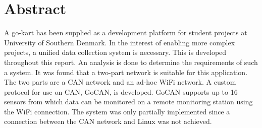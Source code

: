 \section*{Abstract}
A go-kart has been supplied as a development platform for student projects at University of Southern Denmark.
In the interest of enabling more complex projects, a unified data collection system is necessary.
This is developed throughout this report. 
An analysis is done to determine the requirements of such a system.
It was found that a two-part network is suitable for this application.
The two parts are a CAN network and an ad-hoc WiFi network.
A custom protocol for use on CAN, GoCAN, is developed.
GoCAN supports up to 16 sensors from which data can be monitored on a remote monitoring station using the WiFi connection.
The system was only partially implemented since a connection between the CAN network and Linux was not achieved.
